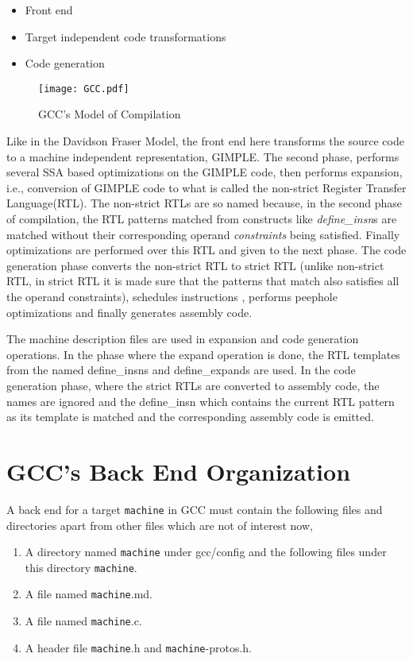 \begin{itemize}
 \item Front end
 \item Target independent code transformations
 \item Code generation
\end{itemize}

\begin{figure}[htb!]
\centering%
\texttt{[image: GCC.pdf]}
\caption{GCC's Model of Compilation}
\label{fig:FigureGCC}
\end{figure}

Like in the Davidson Fraser Model, the front end here transforms the source code to a machine independent representation, GIMPLE.
The second phase, performs several SSA based optimizations on the GIMPLE code, then performs expansion, i.e., conversion of GIMPLE
code to what is called the non-strict Register Transfer Language(RTL). The non-strict RTLs are so named because, in the second phase of compilation,
the RTL patterns matched from constructs like {\em define\_insn}s are matched without their corresponding operand 
{\em constraints} being satisfied. Finally optimizations are performed over this RTL and given to the next phase. The code generation phase 
converts the non-strict RTL to strict RTL (unlike non-strict RTL, in strict RTL it is made sure that the patterns that match also satisfies all the
operand constraints), schedules instructions , performs peephole optimizations and finally generates assembly code.  

The machine description files are used in  expansion and code generation operations. In the phase where the expand operation
is done, the RTL templates from the named define\_insns and define\_expands are used. In the code generation phase, where the
strict RTLs are converted to assembly code, the names are ignored and the define\_insn which contains the current RTL pattern as
its template is matched and the corresponding assembly code is emitted. 

\section{GCC's Back End Organization}
 A back end for a target {\tt machine} in GCC must contain the following files and directories apart from other files which are not of 
interest now,
\begin{enumerate}
 \item A directory named {\tt machine} under gcc/config and the following files under this directory {\tt machine}.
\item A file named {\tt machine}.md.
\item A file named {\tt machine}.c.
\item A header file {\tt machine}.h and {\tt machine}-protos.h.
\end{enumerate}

